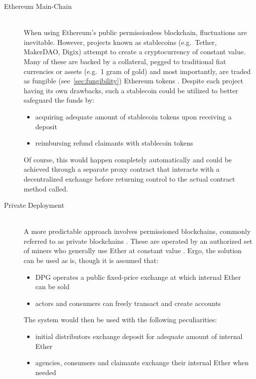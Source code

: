 \begin{description}
	\item[Ethereum Main-Chain]
	\hfill \\
	When using Ethereum's public permissionless blockchain, fluctuations are inevitable. However, projects known as stablecoins (e.g.~Tether, MakerDAO, Digix) attempt to create a cryptocurrency of constant value. Many of these are backed by a collateral, pegged to traditional fiat currencies or assets (e.g.~1 gram of gold) and most importantly, are traded as fungible (see~\ref{sec:fungibility}) Ethereum tokens \cite{stablecoins}. Despite each project having its own drawbacks, such a stablecoin could be utilized to better safeguard the funds by: 
	
	\begin{itemize}
  		\item acquiring adequate amount of stablecoin tokens upon receiving a deposit
  		\item reimbursing refund claimants with stablecoin tokens
	\end{itemize}

	Of course, this would happen completely automatically and could be achieved through a separate proxy contract that interacts with a decentralized exchange before returning control to the actual contract method called. 
	
	\item[Private Deployment]
	\hfill \\
	A more predictable approach involves permissioned blockchains, commonly referred to as private blockchains \cite[p.~37]{nist2018}. These are operated by an authorized set of miners who generally use Ether at constant value \cite[p.~36]{nist2018}. Ergo, the solution can be used as is, though it is assumed that:

	\begin{itemize}
  		\item \ac{DPG} operates a public fixed-price exchange at which internal Ether can be sold
  		\item actors and consumers can freely transact and create accounts
	\end{itemize}
	
	The system would then be used with the following peculiarities:
		
	\begin{itemize}
  		\item initial distributors exchange deposit for adequate amount of internal Ether 
  		\item agencies, consumers and claimants exchange their internal Ether when needed
	\end{itemize}
	

\end{description}
